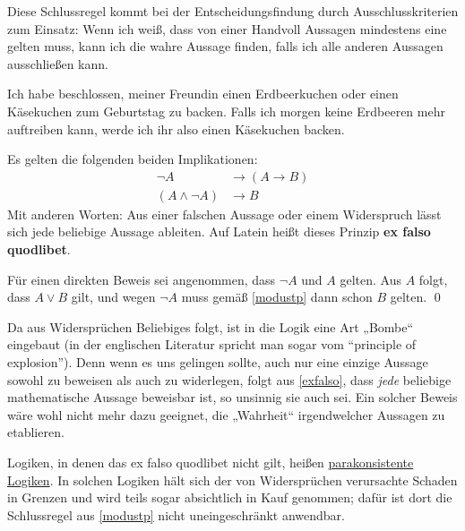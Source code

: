 \begin{bem}
    Diese Schlussregel kommt bei der Entscheidungsfindung durch Ausschlusskriterien zum Einsatz: Wenn ich weiß, dass von einer Handvoll Aussagen mindestens eine gelten muss, kann ich die wahre Aussage finden, falls ich alle anderen Aussagen ausschließen kann.
\end{bem}


\begin{bsp}
    Ich habe beschlossen, meiner Freundin einen Erdbeerkuchen oder einen Käsekuchen zum Geburtstag zu backen. Falls ich morgen keine Erdbeeren mehr auftreiben kann, werde ich ihr also einen Käsekuchen backen.
\end{bsp}


\begin{satz} \label{exfalso} 
    Es gelten die folgenden beiden Implikationen:
    \begin{align*}
        \neg A & \to (A\to B) \\
        (A\land \neg A) & \to B
    \end{align*}
    Mit anderen Worten: Aus einer falschen Aussage oder einem Widerspruch lässt sich jede beliebige Aussage ableiten. Auf Latein heißt dieses Prinzip \textbf{ex falso quodlibet}.
\end{satz}


\begin{bew}
    Für einen direkten Beweis sei angenommen, dass $\neg A$ und $A$ gelten. Aus $A$ folgt, dass $A\lor B$ gilt, und wegen $\neg A$ muss gemäß \cref{modustp} dann schon $B$ gelten. \qed
\end{bew}


\begin{vorschau} \label{explosion}
    Da aus Widersprüchen Beliebiges folgt, ist in die Logik eine Art „Bombe“ eingebaut (in der englischen Literatur spricht man sogar vom ``principle of explosion''). Denn wenn es uns gelingen sollte, auch nur eine einzige Aussage sowohl zu beweisen als auch zu widerlegen, folgt aus \cref{exfalso}, dass \emph{jede} beliebige mathematische Aussage beweisbar ist, so unsinnig sie auch sei. Ein solcher Beweis wäre wohl nicht mehr dazu geeignet, die „Wahrheit“ irgendwelcher Aussagen zu etablieren.
    
    Logiken, in denen das ex falso quodlibet nicht gilt, heißen \href{https://ncatlab.org/nlab/show/paraconsistent+logic}{parakonsistente Logiken}. In solchen Logiken hält sich der von Widersprüchen verursachte Schaden in Grenzen und wird teils sogar absichtlich in Kauf genommen; dafür ist dort die Schlussregel aus \cref{modustp} nicht uneingeschränkt anwendbar.
\end{vorschau}





